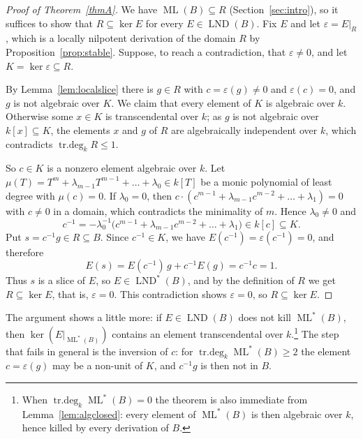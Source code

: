 \documentclass[11pt]{amsart}
\theoremstyle{definition}
\DeclareMathOperator{\ML}{ML}
\DeclareMathOperator{\LND}{LND}
\DeclareMathOperator{\trdeg}{tr.deg}
\newcommand{\MLs}{\ML^{*}}
\newcommand{\LNDs}{\LND^{*}}
\newcommand{\td}[1]{\trdeg_k #1}
\begin{document}
\begin{proof}[Proof of Theorem~\ref{thmA}]
We have $\ML(B)\subseteq R$ (Section~\ref{sec:intro}), so it suffices to show that $R\subseteq\ker E$ for every $E\in\LND(B)$. Fix $E$ and let $\varepsilon=E|_R$, which is a locally nilpotent derivation of the domain $R$ by Proposition~\ref{prop:stable}. Suppose, to reach a contradiction, that $\varepsilon\neq0$, and let $K=\ker\varepsilon\subseteq R$.

By Lemma~\ref{lem:localslice} there is $g\in R$ with $c=\varepsilon(g)\neq0$ and $\varepsilon(c)=0$, and $g$ is not algebraic over $K$. We claim that every element of $K$ is algebraic over $k$. Otherwise some $x\in K$ is transcendental over $k$; as $g$ is not algebraic over $k[x]\subseteq K$, the elements $x$ and $g$ of $R$ are algebraically independent over $k$, which contradicts $\td{R}\le1$.

So $c\in K$ is a nonzero element algebraic over $k$. Let $\mu(T)=T^m+\lambda_{m-1}T^{m-1}+\dots+\lambda_0\in k[T]$ be a monic polynomial of least degree with $\mu(c)=0$. If $\lambda_0=0$, then $c\cdot(c^{m-1}+\lambda_{m-1}c^{m-2}+\dots+\lambda_1)=0$ with $c\neq0$ in a domain, which contradicts the minimality of $m$. Hence $\lambda_0\neq0$ and
\[
c^{-1}=-\lambda_0^{-1}\bigl(c^{m-1}+\lambda_{m-1}c^{m-2}+\dots+\lambda_1\bigr)\in k[c]\subseteq K .
\]
Put $s=c^{-1}g\in R\subseteq B$. Since $c^{-1}\in K$, we have $E(c^{-1})=\varepsilon(c^{-1})=0$, and therefore
\[
E(s)=E(c^{-1})\,g+c^{-1}E(g)=c^{-1}c=1 .
\]
Thus $s$ is a slice of $E$, so $E\in\LNDs(B)$, and by the definition of $R$ we get $R\subseteq\ker E$, that is, $\varepsilon=0$. This contradiction shows $\varepsilon=0$, so $R\subseteq\ker E$.
\end{proof}

The argument shows a little more: if $E\in\LND(B)$ does not kill $\MLs(B)$, then $\ker(E|_{\MLs(B)})$ contains an element transcendental over $k$.\footnote{When $\td{\MLs(B)}=0$ the theorem is also immediate from Lemma~\ref{lem:algclosed}: every element of $\MLs(B)$ is then algebraic over $k$, hence killed by every derivation of $B$.} The step that fails in general is the inversion of $c$: for $\td{\MLs(B)}\ge2$ the element $c=\varepsilon(g)$ may be a non-unit of $K$, and $c^{-1}g$ is then not in $B$.
\end{document}
